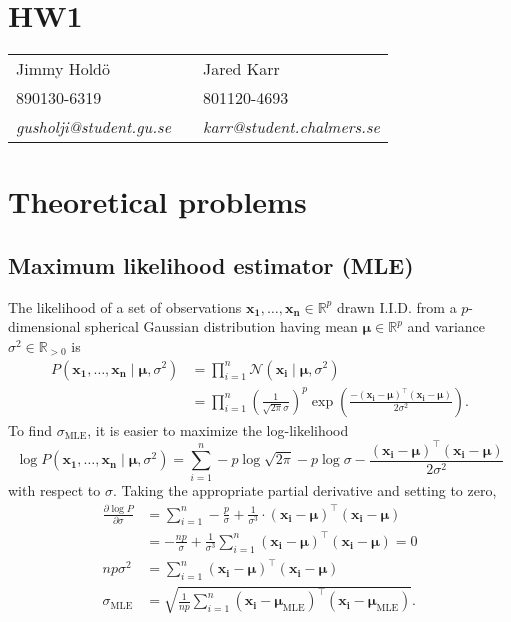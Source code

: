 \documentclass[a4paper,11pt]{article}
\DeclareMathOperator{\given}{\mid}
\begin{document}
\section*{HW1}

\begin{tabular*}{0.9\textwidth}{@{\extracolsep{\fill} } lll}
Jimmy Hold\"{o} & & Jared Karr\\
890130-6319 & & 801120-4693\\
\it{gusholji@student.gu.se} & & \it{karr@student.chalmers.se}\\
\end{tabular*}

\section{Theoretical problems}
\subsection{Maximum likelihood estimator (MLE)}
The likelihood of a set of observations $\mathbf{x_1},\dots,\mathbf{x_n}\in\mathbb{R}^p$ drawn I.I.D. from a $p$-dimensional spherical Gaussian distribution having mean $\boldsymbol\mu\in\mathbb{R}^p$ and variance $\sigma^2\in\mathbb{R}_{>0}$ is
\begin{align*}
  P(\mathbf{x_1},\dots,\mathbf{x_n}\given \boldsymbol\mu,\sigma^2)
    &=\prod_{i=1}^n\mathcal{N}(\mathbf{x_i}\given \boldsymbol\mu, \sigma^2)\\
    &=\prod_{i=1}^n\left(
        \frac{1}{\sqrt{2\pi}\sigma}
      \right)^p\exp\left(
        \frac{-(\mathbf{x_i}-\boldsymbol\mu)^\top(\mathbf{x_i}-\boldsymbol\mu)}
             {2\sigma^2}
      \right).
\end{align*}
To find $\sigma_\mathrm{MLE}$, it is easier to maximize the log-likelihood
\begin{equation*}
  \log P(\mathbf{x_1},\dots,\mathbf{x_n}\given\boldsymbol\mu,\sigma^2)
    =\sum_{i=1}^n
      -p\log\sqrt{2\pi}
      -p\log\sigma
      -\frac{(\mathbf{x_i}-\boldsymbol\mu)^\top(\mathbf{x_i}-\boldsymbol\mu)}{2\sigma^2} 
\end{equation*}
with respect to $\sigma$. Taking the appropriate partial derivative and setting to zero,
\begin{align*}
\frac{\partial\log P}{\partial\sigma}
  &=\sum_{i=1}^n
    -\frac{p}{\sigma}
    +\frac{1}{\sigma^3}\cdot(\mathbf{x_i}-\boldsymbol\mu)^\top(\mathbf{x_i}-\boldsymbol\mu)\\
  &=-\frac{np}{\sigma}
    +\frac{1}{\sigma^3}\sum_{i=1}^n(\mathbf{x_i}-\boldsymbol\mu)^\top(\mathbf{x_i}-\boldsymbol\mu)=0\\
np\sigma^2
  &=\sum_{i=1}^n(\mathbf{x_i}-\boldsymbol\mu)^\top(\mathbf{x_i}-\boldsymbol\mu)\\
\sigma_\mathrm{MLE}&=\sqrt{\frac{1}{np}\sum_{i=1}^n(\mathbf{x_i}-\boldsymbol\mu_\mathrm{MLE})^\top(\mathbf{x_i}-\boldsymbol\mu_\mathrm{MLE})}.
\end{align*}
\end{document}
